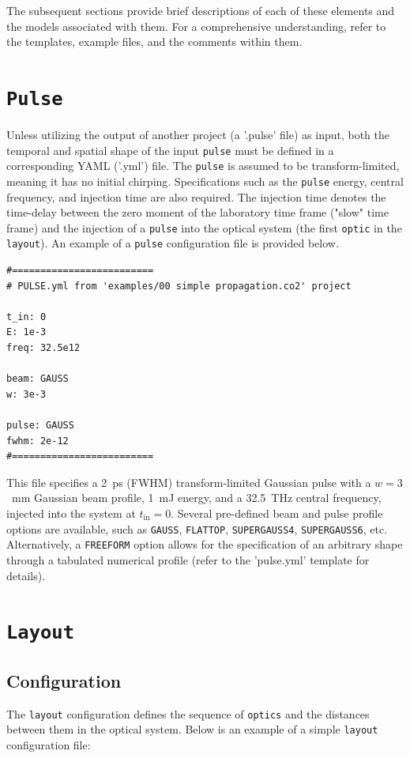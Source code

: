 \documentclass{report}
\begin{document}
The subsequent sections provide brief descriptions of each of these elements and the models associated with them. For a comprehensive understanding, refer to the templates, example files, and the comments within them.


\section{\texttt{Pulse}}
Unless utilizing the output of another project (a '.pulse' file) as input, both the temporal and spatial shape of the input \texttt{pulse} must be defined in a corresponding YAML ('.yml') file. The \texttt{pulse} is assumed to be transform-limited, meaning it has no initial chirping. Specifications such as the \texttt{pulse} energy, central frequency, and injection time are also required. The injection time denotes the time-delay between the zero moment of the laboratory time frame ("slow" time frame) and the injection of a \texttt{pulse} into the optical system (the first \texttt{optic} in the \texttt{layout}). An example of a \texttt{pulse} configuration file is provided below.

\begin{verbatim}
#=========================
# PULSE.yml from 'examples/00 simple propagation.co2' project

t_in: 0
E: 1e-3
freq: 32.5e12

beam: GAUSS
w: 3e-3

pulse: GAUSS
fwhm: 2e-12
#=========================
\end{verbatim}

This file specifies a 2~ps (FWHM) transform-limited Gaussian pulse with a $w=3$~mm Gaussian beam profile, 1~mJ energy, and a 32.5~THz central frequency, injected into the system at $t_{\text{in}}=0$. Several pre-defined beam and pulse profile options are available, such as \texttt{GAUSS}, \texttt{FLATTOP}, \texttt{SUPERGAUSS4}, \texttt{SUPERGAUSS6}, etc. Alternatively, a \texttt{FREEFORM} option allows for the specification of an arbitrary shape through a tabulated numerical profile (refer to the 'pulse.yml' template for details).


\section{\texttt{Layout}}
\subsection{Configuration}
The \texttt{layout} configuration defines the sequence of \texttt{optics} and the distances between them in the optical system. Below is an example of a simple \texttt{layout} configuration file:
\end{document}
